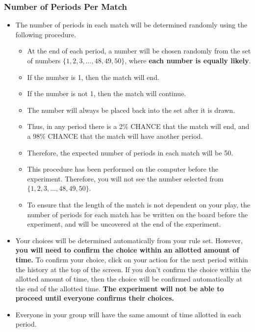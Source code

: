 \documentclass[11pt]{article}
\newcommand{\dblbkt}[1]{}
\begin{document}
\subsubsection*{\dblbkt{4}Number of Periods Per Match} 

\begin{itemize} 
\item The number of periods in each match will be determined randomly using the following procedure.  
\begin{itemize} 
  \item At the end of each period, \dblbkt{1}a number will be chosen randomly from the set of numbers \dblbkt{1} $ \{1,2,3,\ldots,48,49,50\}$, where {\bf each number is equally likely}.  
  \item \dblbkt{1}If the number is 1, then the match will end.
  \item \dblbkt{1}If the number is not 1, then the match will continue.
  \item The number will always be placed back into the set after it is drawn.  
  \item Thus, in any period there is a 2\% CHANCE that the match will end, and a 98\% CHANCE that the match will have another period.
  \item Therefore, \dblbkt{1}the expected number of periods in each match will be 50.
  \item \dblbkt{2}This procedure has been performed on the computer before the experiment. Therefore, you will not see the number selected from $ \{1,2,3,\ldots,48,49,50\}$.
  \item To ensure that the length of the match is not dependent on your play, the number of periods for each match has be written on the board before the experiment, and will be uncovered at the end of the experiment.  
\end{itemize} 
\item \dblbkt{3}Your choices will be determined \dblbkt{1}automatically from your rule set. However, {\bf you will need to confirm the \dblbkt{1}choice within an allotted amount of time.} To confirm your choice, \dblbkt{1}click on your action for the next period within the history at the top of the screen. If you don't confirm the choice within the allotted amount of time, \dblbkt{1}then the choice will be confirmed automatically at the end of the allotted time. {\bf The experiment will not be able to proceed until everyone confirms their choices.}
\item \dblbkt{1}Everyone in your group will have the same amount of time allotted in each period. 
\end{itemize}
\end{document}
